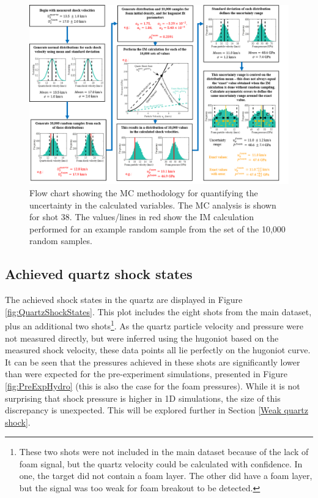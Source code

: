 \begin{landscape}
\begin{figure} 
\begin{centering}
\includegraphics[width=1.5\textwidth]{figures/Experiment/FlowChart.png}%
\caption{\label{fig:MC Flow Chart} Flow chart showing the MC methodology for quantifying the uncertainty in the calculated variables. The MC analysis is shown for shot 38. The values/lines in red show the IM calculation performed for an example random sample from the set of the 10,000 random samples.}
\end{centering}
\end{figure}
\end{landscape}


\subsection{Achieved quartz shock states} \label{Achieved quartz shock states}

The achieved shock states in the quartz are displayed in Figure \ref{fig:QuartzShockStates}. This plot includes the eight shots from the main dataset, plus an additional two shots\footnote{These two shots were not included in the main dataset because of the lack of foam signal, but the quartz velocity could be calculated with confidence. In one, the target did not contain a foam layer. The other did have a foam layer, but the signal was too weak for foam breakout to be detected.}. As the quartz particle velocity and pressure were not measured directly, but were inferred using the hugoniot based on the measured shock velocity, these data points all lie perfectly on the hugoniot curve. It can be seen that the pressures achieved in these shots are significantly lower than were expected for the pre-experiment simulations, presented in Figure \ref{fig:PreExpHydro} (this is also the case for the foam pressures). While it is not surprising that shock pressure is higher in 1D simulations, the size of this discrepancy is unexpected. This will be explored further in Section \ref{Weak quartz shock}.

